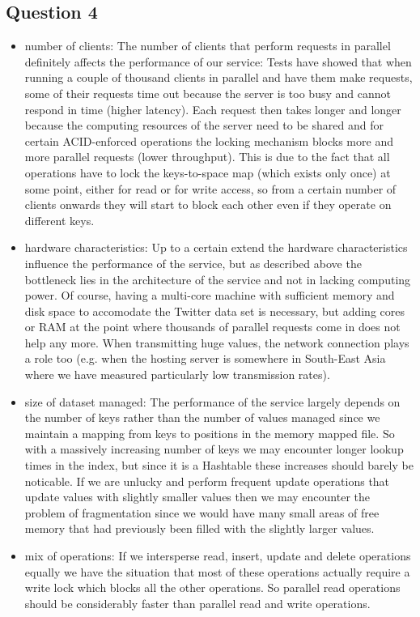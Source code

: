\documentclass[12pt,a4paper]{article}
\begin{document}
\subsection*{Question 4}
\label{sec:pq4}
\begin{itemize}
  \item number of clients: The number of clients that perform requests in parallel definitely affects the performance of our service: Tests have showed that when running a couple of thousand clients in parallel and have them make requests, some of their requests time out because the server is too busy and cannot respond in time (higher latency). Each request then takes longer and longer because the computing resources of the server need to be shared and for certain ACID-enforced operations the locking mechanism blocks more and more parallel requests (lower throughput). This is due to the fact that all operations have to lock the keys-to-space map (which exists only once) at some point, either for read or for write access, so from a certain number of clients onwards they will start to block each other even if they operate on different keys.
  \item hardware characteristics: Up to a certain extend the hardware characteristics influence the performance of the service, but as described above the bottleneck lies in the architecture of the service and not in lacking computing power. Of course, having a multi-core machine with sufficient memory and disk space to accomodate the Twitter data set is necessary, but adding cores or RAM at the point where thousands of parallel requests come in does not help any more. When transmitting huge values, the network connection plays a role too (e.g. when the hosting server is somewhere in South-East Asia where we have measured particularly low transmission rates).
  \item size of dataset managed: The performance of the service largely depends on the number of keys rather than the number of values managed since we maintain a mapping from keys to positions in the memory mapped file. So with a massively increasing number of keys we may encounter longer lookup times in the index, but since it is a Hashtable these increases should barely be noticable. If we are unlucky and perform frequent update operations that update values with slightly smaller values then we may encounter the problem of fragmentation since we would have many small areas of free memory that had previously been filled with the slightly larger values.
  \item mix of operations: If we intersperse read, insert, update and delete operations equally we have the situation that most of these operations actually require a write lock which blocks all the other operations. So parallel read operations should be considerably faster than parallel read and write operations.

\end{itemize}
\end{document}
